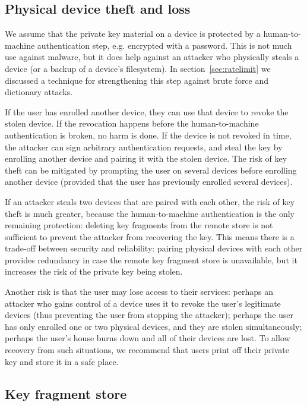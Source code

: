 \subsection{Physical device theft and loss}

We assume that the private key material on a device is protected by a human-to-machine
authentication step, e.g. encrypted with a password. This is not much use against malware, but it
does help against an attacker who physically steals a device (or a backup of a device's filesystem).
In section~\ref{sec:ratelimit} we discussed a technique for strengthening this step against brute
force and dictionary attacks.

If the user has enrolled another device, they can use that device to revoke the stolen device. If
the revocation happens before the human-to-machine authentication is broken, no harm is done. If the
device is not revoked in time, the attacker can sign arbitrary authentication requests, and steal
the key by enrolling another device and pairing it with the stolen device. The risk of key theft can
be mitigated by prompting the user on several devices before enrolling another device (provided that
the user has previously enrolled several devices).

If an attacker steals two devices that are paired with each other, the risk of key theft is much
greater, because the human-to-machine authentication is the only remaining protection: deleting key
fragments from the remote store is not sufficient to prevent the attacker from recovering the key.
This means there is a trade-off between security and reliability: pairing physical devices with each
other provides redundancy in case the remote key fragment store is unavailable, but it increases the
risk of the private key being stolen.

Another risk is that the user may lose access to their services: perhaps an attacker who gains
control of a device uses it to revoke the user's legitimate devices (thus preventing the user from
stopping the attacker); perhaps the user has only enrolled one or two physical devices, and they are
stolen simultaneously; perhaps the user's house burns down and all of their devices are lost. To
allow recovery from such situations, we recommend that users print off their private key and store
it in a safe place.

\subsection{Key fragment store}

